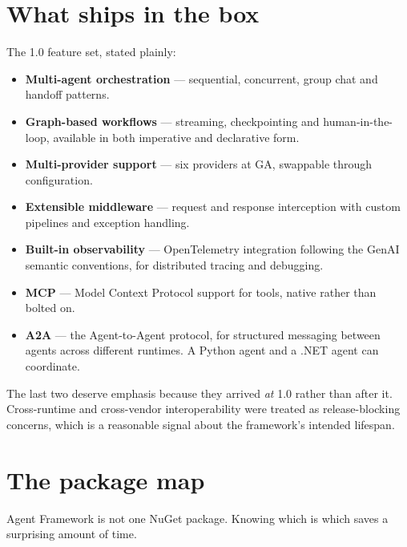 \section{What ships in the box}

The 1.0 feature set, stated plainly:

\begin{itemize}[leftmargin=1.4em]
\item \textbf{Multi-agent orchestration} --- sequential, concurrent, group chat
      and handoff patterns.
\item \textbf{Graph-based workflows} --- streaming, checkpointing and
      human-in-the-loop, available in both imperative and declarative form.
\item \textbf{Multi-provider support} --- six providers at GA, swappable
      through configuration.
\item \textbf{Extensible middleware} --- request and response interception with
      custom pipelines and exception handling.
\item \textbf{Built-in observability} --- OpenTelemetry integration following the
      GenAI semantic conventions, for distributed tracing and debugging.
\item \textbf{MCP} --- Model Context Protocol support for tools, native rather
      than bolted on.
\item \textbf{A2A} --- the Agent-to-Agent protocol, for structured messaging
      between agents across different runtimes. A Python agent and a .NET agent
      can coordinate.
\end{itemize}

The last two deserve emphasis because they arrived \emph{at} 1.0 rather than
after it. Cross-runtime and cross-vendor interoperability were treated as
release-blocking concerns, which is a reasonable signal about the framework's
intended lifespan.

\section{The package map}
\label{sec:packages}

Agent Framework is not one NuGet package. Knowing which is which saves a
surprising amount of time.

